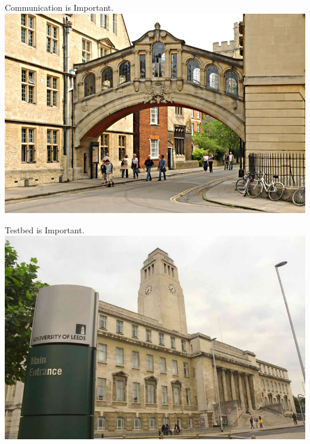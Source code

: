 \documentclass[10pt]{beamer}
\begin{document}
\begin{frame}{Communication is Important.}
    \centering
    \includegraphics[width=\textwidth, height = 0.9\textheight]{Figures/Oxford.jpg}
\end{frame}

\begin{frame}{Testbed is Important.}
    \centering
    \includegraphics[width=\textwidth, height = 0.9\textheight]{Figures/Leeds.jpg}
\end{frame}
\end{document}
